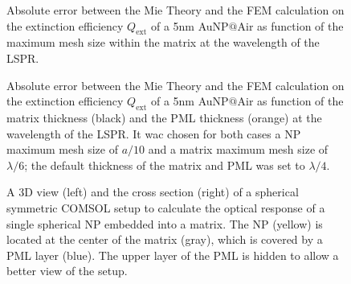 %
\begin{figure}[h!]\centering
	\def\svgwidth{.8\textwidth} \small
{}
\vspace*{-1em}
\caption[Extinction Efficiency Absolute Error: Matrix Max Mesh Size Analysis]{Absolute error between the Mie Theory and the FEM calculation on the extinction efficiency $Q_\text{ext}$ of a 5nm AuNP$@$Air as function of the maximum mesh size within the matrix at the wavelength of the LSPR.}
\label{fig:Eff:sphere:matrix}
\end{figure}


\begin{figure}[h!]\centering
	\def\svgwidth{.8\textwidth} \small
{}
\vspace*{-1em}
\caption[Extinction Efficiency Absolute Error: Matrix and PML Thickness Analysis]{Absolute error between the Mie Theory and the FEM calculation on the extinction efficiency $Q_\text{ext}$ of a 5nm AuNP$@$Air as function of the matrix thickness (black) and the PML thickness (orange) at the wavelength of the LSPR. It wac chosen for both cases a NP maximum mesh size of $a/10$ and a matrix maximum mesh size of $\lambda/6$; the default thickness of the matrix and PML was set to $\lambda/4$.}
\label{fig:Eff:sphere:thickness}
\end{figure}








%
%
%




\begin{figure}[h!]\centering
	\def\svgwidth{.8\textwidth} \small
{}
\vspace*{0em}
\caption[Spherical symmetric COMSOL Setup]{A 3D view (left) and the cross section (right) of a spherical symmetric COMSOL setup to calculate the optical response of a single spherical NP embedded into a matrix. The NP (yellow) is located at the center of the matrix (gray), which is covered by a PML layer (blue). The upper layer of the PML is hidden to allow a better view of the setup.}
\label{fig:setup:sphere}
\end{figure}

